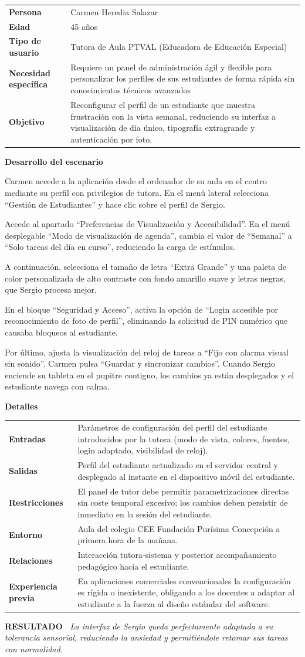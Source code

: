\documentclass[11pt,a4paper]{article}
\makeatletter
\newcommand{\escenariocard}[6]{%
\needspace{10\baselineskip}
\begin{tcolorbox}[breakable,enhanced,colback=white,colframe=brandgreen,boxrule=0.8pt,arc=3pt,
 left=9pt,right=9pt,top=7pt,bottom=7pt,before skip=10pt,after skip=10pt,
 title={\textbf{\color{white}ESCENARIO #1} \\[1pt] {\small\color{tintgreen}#2}},
 colbacktitle=brandgreen,coltitle=white,fonttitle=\bfseries,boxed title style={colframe=brandgreen}]
{\setlength{\parskip}{0pt}\renewcommand{\arraystretch}{1.35}\rowcolors{1}{tintgreen}{white}\arrayrulecolor{white}
\begin{tabular}{@{\hspace{4pt}}>{\bfseries\color{brandgreen}}p{3.4cm}p{11.4cm}@{}}
#3 \\
\end{tabular}}
\vspace{6pt}
\textbf{\color{brandblue}Desarrollo del escenario}\par\vspace{2pt}
#4
\par\vspace{4pt}
\textbf{\color{brandblue}Detalles}\par\vspace{2pt}
{\setlength{\parskip}{0pt}\renewcommand{\arraystretch}{1.35}\rowcolors{1}{tintblue}{white}\arrayrulecolor{white}
\begin{tabular}{@{\hspace{4pt}}>{\bfseries\color{brandblue}}p{3.4cm}p{11.4cm}@{}}
#5 \\
\end{tabular}}
\vspace{6pt}
\begin{tcolorbox}[colback=tintblue,colframe=brandblue,boxrule=0pt,sharp corners,borderline west={3pt}{0pt}{brandblue},left=8pt,right=8pt,top=5pt,bottom=5pt]
\textbf{\small\color{brandblue}RESULTADO\ } {\small\itshape #6}
\end{tcolorbox}
\end{tcolorbox}
}
\makeatother
\begin{document}
\escenariocard{7}{Ajuste del perfil y simplificación de la interfaz ante sobrecarga cognitiva}{%
Persona & Carmen Heredia Salazar \\
Edad & 45 años \\
Tipo de usuario & Tutora de Aula PTVAL (Educadora de Educación Especial) \\
Necesidad específica & Requiere un panel de administración ágil y flexible para personalizar los perfiles de sus estudiantes de forma rápida sin conocimientos técnicos avanzados \\
Objetivo & Reconfigurar el perfil de un estudiante que muestra frustración con la vista semanal, reduciendo su interfaz a visualización de día único, tipografía extragrande y autenticación por foto.
}{%
Carmen accede a la aplicación desde el ordenador de su aula en el centro mediante su perfil con privilegios de tutora. En el menú lateral selecciona ``Gestión de Estudiantes'' y hace clic sobre el perfil de Sergio.

Accede al apartado ``Preferencias de Visualización y Accesibilidad''. En el menú desplegable ``Modo de visualización de agenda'', cambia el valor de ``Semanal'' a ``Solo tareas del día en curso'', reduciendo la carga de estímulos.

A continuación, selecciona el tamaño de letra ``Extra Grande'' y una paleta de color personalizada de alto contraste con fondo amarillo suave y letras negras, que Sergio procesa mejor.

En el bloque ``Seguridad y Acceso'', activa la opción de ``Login accesible por reconocimiento de foto de perfil'', eliminando la solicitud de PIN numérico que causaba bloqueos al estudiante.

Por último, ajusta la visualización del reloj de tareas a ``Fijo con alarma visual sin sonido''. Carmen pulsa ``Guardar y sincronizar cambios''. Cuando Sergio enciende su tableta en el pupitre contiguo, los cambios ya están desplegados y el estudiante navega con calma.
}{%
Entradas & Parámetros de configuración del perfil del estudiante introducidos por la tutora (modo de vista, colores, fuentes, login adaptado, visibilidad de reloj). \\
Salidas & Perfil del estudiante actualizado en el servidor central y desplegado al instante en el dispositivo móvil del estudiante. \\
Restricciones & El panel de tutor debe permitir parametrizaciones directas sin coste temporal excesivo; los cambios deben persistir de inmediato en la sesión del estudiante. \\
Entorno & Aula del colegio CEE Fundación Purísima Concepción a primera hora de la mañana. \\
Relaciones & Interacción tutora-sistema y posterior acompañamiento pedagógico hacia el estudiante. \\
Experiencia previa & En aplicaciones comerciales convencionales la configuración es rígida o inexistente, obligando a los docentes a adaptar al estudiante a la fuerza al diseño estándar del software.
}{La interfaz de Sergio queda perfectamente adaptada a su tolerancia sensorial, reduciendo la ansiedad y permitiéndole retomar sus tareas con normalidad.}
\end{document}
